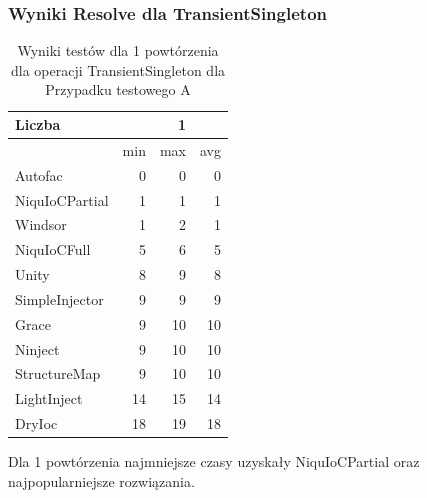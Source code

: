 \documentclass[12pt]{article}
\begin{document}
\subsubsection{Wyniki Resolve dla TransientSingleton}
\begin{table}[H]
\captionsetup{belowskip=0pt,aboveskip=0pt}
\begin{center}
\begin{small}
	\begin{tabular}{ | l | r r r | }
    		\hline
Liczba & & 1 & \\ \hline
 & min & max & avg \\ \hline
Autofac & 0 & 0 & 0 \\ \hline
NiquIoCPartial & 1 & 1 & 1 \\ \hline
Windsor & 1 & 2 & 1 \\ \hline
NiquIoCFull & 5 & 6 & 5 \\ \hline
Unity & 8 & 9 & 8 \\ \hline
SimpleInjector & 9 & 9 & 9 \\ \hline
Grace & 9 & 10 & 10 \\ \hline
Ninject & 9 & 10 & 10 \\ \hline
StructureMap & 9 & 10 & 10 \\ \hline
LightInject & 14 & 15 & 14 \\ \hline
DryIoc & 18 & 19 & 18 \\ \hline
  	\end{tabular}
\end{small}
\end{center}
\caption{Wyniki testów dla 1 powtórzenia dla operacji TransientSingleton dla Przypadku testowego A}
\label{TestCaseA_TransientSingleton1}
\end{table}
Dla 1 powtórzenia najmniejsze czasy uzyskały NiquIoCPartial oraz najpopularniejsze rozwiązania.
\\ \\
\end{document}
